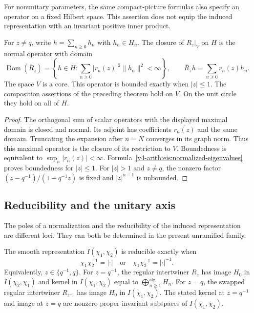 For nonunitary parameters, the same compact-picture formulas also specify
an operator on a fixed Hilbert space.
This assertion does not equip the induced representation with an invariant
positive inner product.

\begin{proposition}
\label{v4-arith:eis:maximal-domain}
For $z\ne q$, write $h=\sum_{n\ge0}h_n$ with $h_n\in H_n$.
The closure of $R_z|_V$ on $H$ is the normal operator with domain
\[
 \operatorname{Dom}(\overline R_z)=
 \left\{h\in H:\sum_{n\ge0}|r_n(z)|^2\|h_n\|^2<\infty\right\},
 \qquad \overline R_zh=\sum_{n\ge0}r_n(z)h_n.
\]
The space $V$ is a core.
This operator is bounded exactly when $|z|\le1$.
The composition assertions of the preceding theorem hold on $V$.
On the unit circle they hold on all of $H$.
\end{proposition}

\begin{proof}
The orthogonal sum of scalar operators with the displayed maximal domain
is closed and normal.
Its adjoint has coefficients $\overline{r_n(z)}$ and the same domain.
Truncating the expansion after $n=N$ converges in its graph norm.
Thus this maximal operator is the closure of its restriction to $V$.
Boundedness is equivalent to $\sup_n|r_n(z)|<\infty$.
Formula~\eqref{v4-arith:eis:normalized-eigenvalues} proves boundedness for
$|z|\le1$.
For $|z|>1$ and $z\ne q$, the nonzero factor
$(z-q^{-1})/(1-q^{-1}z)$ is fixed and $|z|^{n-1}$ is unbounded.
\end{proof}

\subsection{Reducibility and the unitary axis}

The poles of a normalization and the reducibility of the induced
representation are different loci.
They can both be determined in the present unramified family.

\begin{proposition}
\label{v4-arith:eis:reducibility}
The smooth representation $I(\chi_1,\chi_2)$ is reducible exactly when
\[
 \chi_1\chi_2^{-1}=|\cdot|\quad\text{or}\quad
 \chi_1\chi_2^{-1}=|\cdot|^{-1}.
\]
Equivalently, $z\in\{q^{-1},q\}$.
For $z=q^{-1}$, the regular intertwiner $R_z$ has image $H_0$
in $I(\chi_2,\chi_1)$ and kernel in $I(\chi_1,\chi_2)$ equal to $\bigoplus_{n\ge1}^{\mathrm{alg}}H_n$.
For $z=q$, the swapped regular intertwiner $R_{z^{-1}}$ has image
$H_0$ in $I(\chi_1,\chi_2)$.
The stated kernel at $z=q^{-1}$ and image at $z=q$ are nonzero
proper invariant subspaces of $I(\chi_1,\chi_2)$.
\end{proposition}

